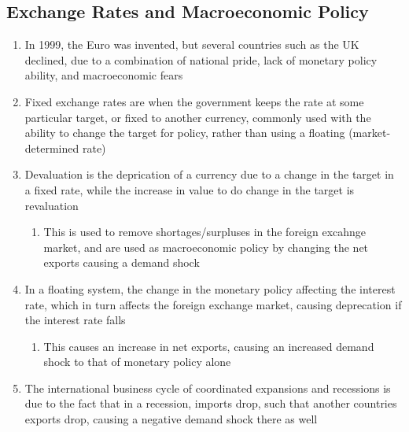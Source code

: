 \documentclass[11 pt, twoside]{article}
\begin{document}
\subsection{Exchange Rates and Macroeconomic Policy}
\begin{enumerate}
\item In 1999, the Euro was invented, but several countries such as the UK declined, due to a combination of national pride, lack of monetary policy ability, and macroeconomic fears
\item Fixed exchange rates are when the government keeps the rate at some particular target, or fixed to another currency, commonly used with the ability to change the target for policy, rather than using a floating (market-determined rate)
\item Devaluation is the deprication of a currency due to a change in the target in a fixed rate, while the increase in value to do change in the target is revaluation
\begin{enumerate}
\item This is used to remove shortages/surpluses in the foreign excahnge market, and are used as macroeconomic policy by changing the net exports causing a demand shock
\end{enumerate}
\item In a floating system, the change in the monetary policy affecting the interest rate, which in turn affects the foreign exchange market, causing deprecation if the interest rate falls
\begin{enumerate}
\item This causes an increase in net exports, causing an increased demand shock to that of monetary policy alone
\end{enumerate}
\item The international business cycle of coordinated expansions and recessions is due to the fact that in a recession, imports drop, such that another countries exports drop, causing a negative demand shock there as well
\end{enumerate}
\end{document}
